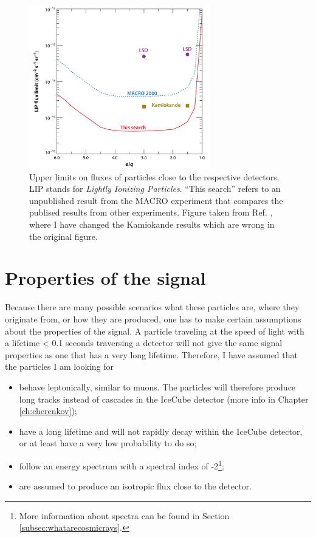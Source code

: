 \begin{figure}
\centering
\includegraphics[width=0.7\textwidth]{chapter2/img/upperlimits_changed.png}
\caption{Upper limits on fluxes of particles close to the respective detectors. LIP stands for \textit{Lightly Ionizing Particles}. ``This search'' refers to an unpublished result from the MACRO experiment that compares the publised results from other experiments. Figure taken from Ref. \cite{Ambrosio:2004ub}, where I have changed the Kamiokande results which are wrong in the original figure.}
\label{fig:upperlimits}
\end{figure}


\section{Properties of the signal}
\label{sec:properties}
Because there are many possible scenarios what these particles are, where they originate from, or how they are produced, one has to make certain assumptions about the properties of the signal. A particle traveling at the speed of light with a lifetime < 0.1 seconds traversing a detector will not give the same signal properties as one that has a very long lifetime. Therefore, I have assumed that the particles I am looking for
\vspace{2mm}

\begin{itemize}
\item behave leptonically, similar to muons. The particles will therefore produce long tracks instead of cascades in the IceCube detector (more info in Chapter \ref{ch:cherenkov});
\item have a long lifetime and will not rapidly decay within the IceCube detector, or at least have a very low probability to do so;
\item follow an energy spectrum with a spectral index of -2\footnote{More information about spectra can be found in Section \ref{subsec:whatarecosmicrays}.};
\item are assumed to produce an isotropic flux close to the detector.
\end{itemize}
\vspace{2mm}


